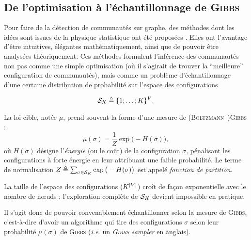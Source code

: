 \subsection{De l'optimisation à l'échantillonnage de \textsc{Gibbs}}

Pour faire de la détection de communautés sur graphe, des méthodes dont les idées sont issues de la physique statistique ont été proposées \cite{Reichardt2006, ConstantPottsModel}.
Elles ont l'avantage d'être intuitives, élégantes mathématiquement, ainsi que de pouvoir être analysées théoriquement.
Ces méthodes formulent l'inférence des communautés non pas comme une simple optimisation (où il s'agirait de trouver la ``meilleure'' configuration de communautés), mais comme un problème d'échantillonnage d'une certaine distribution de probabilité sur l'espace des configurations 

\[
\mathcal S_K \triangleq \{1 ; \dots ; K\}^V.
\]

La loi cible, notée $\mu$, prend souvent la forme d'une mesure de \textsc{(Boltzmann--)Gibbs} \cite{Parisi} :
\[
\mu(\sigma) = \frac{1}{Z} \exp\big(- H(\sigma)\big), 
\]
où $H(\sigma)$ désigne l'\emph{énergie} (ou le coût) de la configuration $\sigma$, pénalisant les configurations à forte énergie en leur attribuant une faible probabilité. 
Le terme de normalisation $Z \triangleq \sum_{\sigma \in \mathcal S_K} \exp\big(- H(\sigma)\big)$ est appelé \emph{fonction de partition}.

La taille de l'espace des configurations ($K^{\lvert V \rvert}$) croît de façon exponentielle avec le nombre de nœuds ; l'exploration complète de $\mathcal S_K$ devient impossible en pratique. 

Il s'agit donc de pouvoir convenablement échantillonner selon la mesure de \textsc{Gibbs}, c'est-à-dire d'avoir un algorithme qui tire des configurations $\sigma$ selon leur probabilité $\mu(\sigma)$ de \textsc{Gibbs} (\emph{i.e.} un \emph{\textsc{Gibbs} sampler} en anglais).



